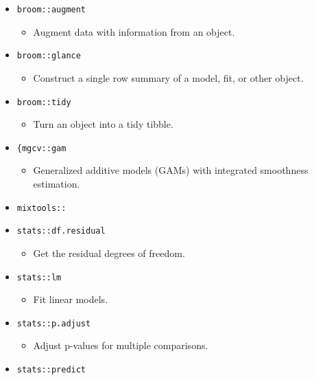\documentclass[
]{book}
\providecommand{\tightlist}{%
  \setlength{\itemsep}{0pt}\setlength{\parskip}{0pt}}
\begin{document}
\begin{itemize}
\tightlist
\item
  \texttt{broom::augment}

  \begin{itemize}
  \tightlist
  \item
    Augment data with information from an object.
  \end{itemize}
\item
  \texttt{broom::glance}

  \begin{itemize}
  \tightlist
  \item
    Construct a single row summary of a model, fit, or other object.
  \end{itemize}
\item
  \texttt{broom::tidy}

  \begin{itemize}
  \tightlist
  \item
    Turn an object into a tidy tibble.
  \end{itemize}
\item
  \texttt{\{mgcv::gam}

  \begin{itemize}
  \tightlist
  \item
    Generalized additive models (GAMs) with integrated smoothness estimation.
  \end{itemize}
\item
  \texttt{mixtools::}
\item
  \texttt{stats::df.residual}

  \begin{itemize}
  \tightlist
  \item
    Get the residual degrees of freedom.
  \end{itemize}
\item
  \texttt{stats::lm}

  \begin{itemize}
  \tightlist
  \item
    Fit linear models.
  \end{itemize}
\item
  \texttt{stats::p.adjust}

  \begin{itemize}
  \tightlist
  \item
    Adjust p-values for multiple comparisons.
  \end{itemize}
\item
  \texttt{stats::predict}


\end{itemize}
\end{document}
